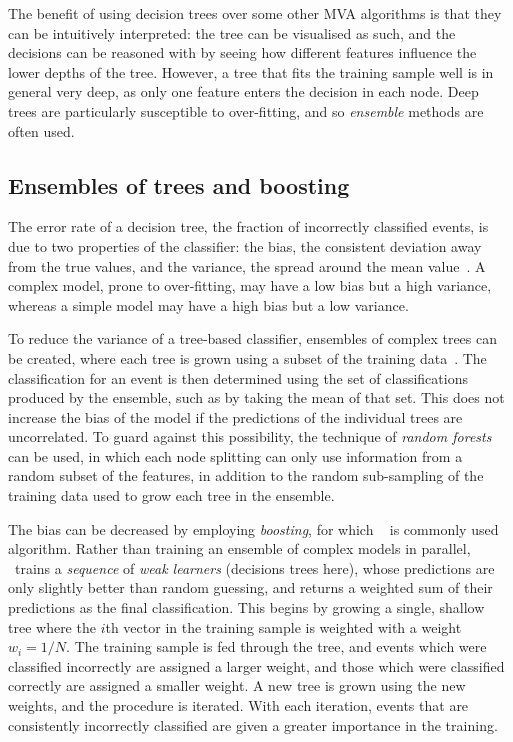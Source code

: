 The benefit of using decision trees over some other \ac{MVA} algorithms is that 
they can be intuitively interpreted: the tree can be visualised as such, and 
the decisions can be reasoned with by seeing how different features influence 
the lower depths of the tree.
However, a tree that fits the training sample well is in general very deep, as 
only one feature enters the decision in each node.
Deep trees are particularly susceptible to over-fitting, and so \emph{ensemble} 
methods are often used.

\subsection{Ensembles of trees and boosting}
\label{chap:cpv:kinematic_weighting:bdt_theory:ensembles}

The error rate of a decision tree, the fraction of incorrectly classified 
events, is due to two properties of the classifier: the bias, the consistent 
deviation away from the true values, and the variance, the spread around the 
mean value~\cite{Breiman96biasvariance}.
A complex model, prone to over-fitting, may have a low bias but a high 
variance, whereas a simple model may have a high bias but a low variance.

To reduce the variance of a tree-based classifier, ensembles of complex trees 
can be created, where each tree is grown using a subset of the training 
data~\cite{Breiman1996}.
The classification for an event is then determined using the set of 
classifications produced by the ensemble, such as by taking the mean of that 
set.
This does not increase the bias of the model if the predictions of the 
individual trees are uncorrelated.
To guard against this possibility, the technique of \emph{random 
  forests}~\cite{Breiman2001,Louppe:14077502} can be used, in which each node 
splitting can only use information from a random subset of the features, in 
addition to the random sub-sampling of the training data used to grow each tree 
in the ensemble.

The bias can be decreased by employing \emph{boosting}, for which 
\adaboost~\cite{Freund1997119} is commonly used algorithm.
Rather than training an ensemble of complex models in parallel, \adaboost\ 
trains a \emph{sequence} of \emph{weak learners} (decisions trees here), whose 
predictions are only slightly better than random guessing, and returns a 
weighted sum of their predictions as the final classification.
This begins by growing a single, shallow tree where the $i$th vector in the 
training sample is weighted with a weight $w_{i} = 1/N$.
The training sample is fed through the tree, and events which were classified 
incorrectly are assigned a larger weight, and those which were classified 
correctly are assigned a smaller weight.
A new tree is grown using the new weights, and the procedure is iterated.
With each iteration, events that are consistently incorrectly classified are 
given a greater importance in the training.

